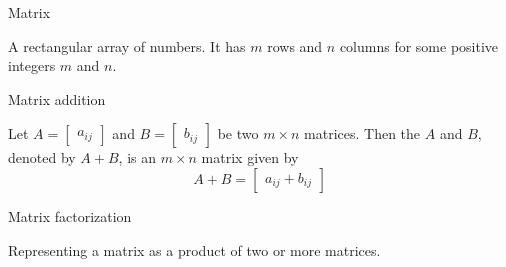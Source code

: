 \documentclass{ximera}
\begin{document}

Matrix
\begin{expandable}
    A rectangular array of numbers.  It has $m$ rows and $n$ columns for some positive integers $m$ and $n$.
\end{expandable}


Matrix addition
\begin{expandable}
    Let $A=\begin{bmatrix} a_{ij}\end{bmatrix} $ and $B=\begin{bmatrix} b_{ij}\end{bmatrix}$ be two
$m\times n$ matrices. Then the  $A$ and $B$, denoted by $A+B$,  is an $m \times n$
matrix  given by 
$$A+B=\begin{bmatrix}a_{ij}+b_{ij}\end{bmatrix}$$
\end{expandable}


Matrix factorization
\begin{expandable}
    Representing a matrix as a product of two or more matrices.
\end{expandable}

\end{document}
